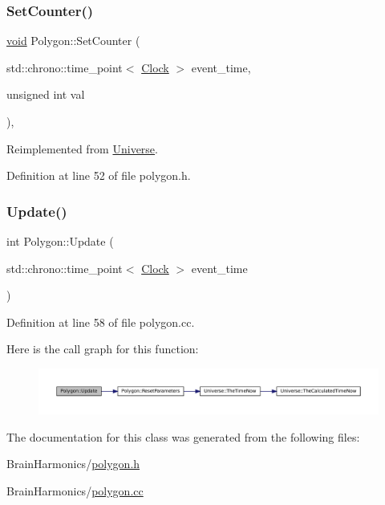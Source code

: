 \mbox{\label{class_polygon_ad12083d8c152a1979b04bead93b6b730}} 
\subsubsection{\texorpdfstring{Set\+Counter()}{SetCounter()}\hspace{0.1cm}{\footnotesize\ttfamily [2/2]}}
{\footnotesize\ttfamily \mbox{\hyperlink{glad_8h_a950fc91edb4504f62f1c577bf4727c29}{void}} Polygon\+::\+Set\+Counter (\begin{DoxyParamCaption}\item[{std\+::chrono\+::time\+\_\+point$<$ \mbox{\hyperlink{universe_8h_a0ef8d951d1ca5ab3cfaf7ab4c7a6fd80}{Clock}} $>$}]{event\+\_\+time,  }\item[{unsigned int}]{val }\end{DoxyParamCaption})\hspace{0.3cm}{\ttfamily [inline]}, {\ttfamily [virtual]}}



Reimplemented from \mbox{\hyperlink{class_universe_aa22202ae740eb1355529afcb13285e91}{Universe}}.



Definition at line 52 of file polygon.\+h.

\mbox{\label{class_polygon_ab3fe58d8ffce2e16589958def88aa188}} 
\subsubsection{\texorpdfstring{Update()}{Update()}}
{\footnotesize\ttfamily int Polygon\+::\+Update (\begin{DoxyParamCaption}\item[{std\+::chrono\+::time\+\_\+point$<$ \mbox{\hyperlink{universe_8h_a0ef8d951d1ca5ab3cfaf7ab4c7a6fd80}{Clock}} $>$}]{event\+\_\+time }\end{DoxyParamCaption})}



Definition at line 58 of file polygon.\+cc.

Here is the call graph for this function\+:\nopagebreak
\begin{figure}[H]
\begin{center}
\leavevmode
\includegraphics[width=350pt]{class_polygon_ab3fe58d8ffce2e16589958def88aa188_cgraph}
\end{center}
\end{figure}


The documentation for this class was generated from the following files\+:\begin{DoxyCompactItemize}
\item 
Brain\+Harmonics/\mbox{\hyperlink{polygon_8h}{polygon.\+h}}\item 
Brain\+Harmonics/\mbox{\hyperlink{polygon_8cc}{polygon.\+cc}}\end{DoxyCompactItemize}
